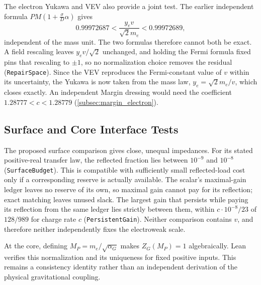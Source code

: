 The electron Yukawa and VEV also provide a joint test. The earlier independent formula $PM(1+\tfrac{\sigma}{D}\alpha)$ gives
\begin{equation}
 0.99972687<\frac{y_e v}{\sqrt{2}m_e}<0.99972689,
\end{equation}
independent of the mass unit. The two formulas therefore cannot both be exact. A field rescaling leaves $y_ev/\sqrt2$ unchanged, and holding the Fermi formula fixed pins that rescaling to $\pm1$, so no normalization choice removes the residual (\texttt{RepairSpace}). Since the VEV reproduces the Fermi-constant value of $v$ within its uncertainty, the Yukawa is now taken from the mass law, $y_e=\sqrt2m_e/v$, which closes exactly. An independent Margin dressing would need the coefficient $1.28777<c<1.28779$ (\cref{subsec:margin_electron}).

\subsection{Surface and Core Interface Tests}
The proposed surface comparison gives close, unequal impedances. For its stated positive-real transfer law, the reflected fraction lies between $10^{-9}$ and $10^{-8}$ (\texttt{SurfaceBudget}). This is compatible with sufficiently small reflected-load cost only if a corresponding reserve is actually available. The scalar's maximal-gain ledger leaves no reserve of its own, so maximal gain cannot pay for its reflection; exact matching leaves unused slack. The largest gain that persists while paying its reflection from the same ledger lies strictly between them, within $c\cdot10^{-8}/23$ of $128/989$ for charge rate $c$ (\texttt{PersistentGain}). Neither comparison contains $v$, and therefore neither independently fixes the electroweak scale.

At the core, defining $M_P=m_e/\sqrt{\alpha_G}$ makes $Z_G(M_P)=1$ algebraically. Lean verifies this normalization and its uniqueness for fixed positive inputs. This remains a consistency identity rather than an independent derivation of the physical gravitational coupling.

